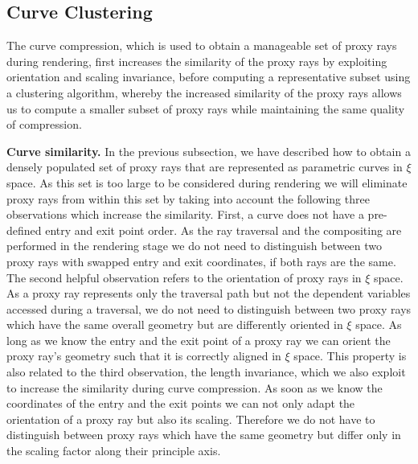 \documentclass[journal]{vgtc}                %
\begin{document}
\subsection{Curve Clustering}\label{subsec:curvecompression}
The curve compression, which is used to obtain a manageable set of proxy rays during rendering, first increases the similarity of the proxy rays by exploiting orientation and scaling invariance, before computing a representative subset using a clustering algorithm, whereby the increased similarity of the proxy rays allows us to compute a smaller subset of proxy rays while maintaining the same quality of compression.

\noindent \textbf{Curve similarity.} In the previous subsection, we have described how to obtain a densely populated set of proxy rays that are represented as parametric curves in $\xi$ space. As this set is too large to be considered during rendering we will eliminate proxy rays from within this set by taking into account the following three observations which increase the similarity. First, a curve does not have a pre-defined entry and exit point order. As the ray traversal and the compositing are performed in the rendering stage we do not need to distinguish between two proxy rays with swapped entry and exit coordinates, if both rays are the same. The second helpful observation refers to the orientation of proxy rays in $\xi$ space. As a proxy ray represents only the traversal path but not the dependent variables accessed during a traversal, we do not need to distinguish between two proxy rays which have the same overall geometry but are differently oriented in $\xi$ space. As long as we know the entry and the exit point of a proxy ray we can orient the proxy ray's geometry such that it is correctly aligned in $\xi$ space. This property is also related to the third observation, the length invariance, which we also exploit to increase the similarity during curve compression. As soon as we know the coordinates of the entry and the exit points we can not only adapt the orientation of a proxy ray but also its scaling. Therefore we do not have to distinguish between proxy rays which have the same geometry but differ only in the scaling factor along their principle axis.
\end{document}
